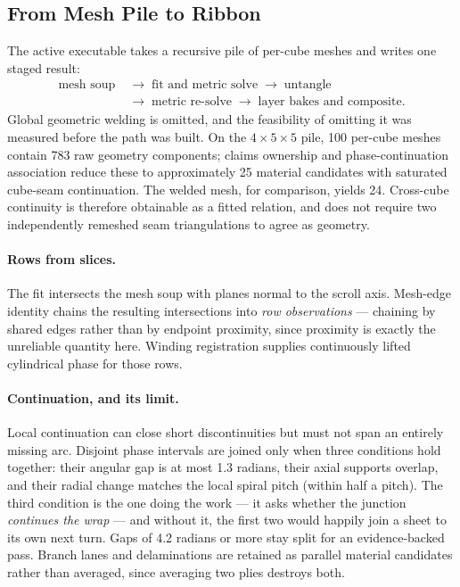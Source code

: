 \subsection{From Mesh Pile to Ribbon}
\label{sec:fit}

The active executable takes a recursive pile of per-cube meshes and writes one staged result:
\begin{align*}
  \text{mesh soup}
  &\;\rightarrow\;\text{fit and metric solve}\;\rightarrow\;\text{untangle}
  \\
  &\;\rightarrow\;\text{metric re-solve}\;\rightarrow\;
  \text{layer bakes and composite}.
\end{align*}
Global geometric welding is omitted, and the feasibility of omitting it was measured before the path was built. On the $4\times5\times5$ pile, 100 per-cube meshes contain 783 raw geometry components; claims ownership and phase-continuation association reduce these to approximately 25 material candidates with saturated cube-seam continuation. The welded mesh, for comparison, yields 24. Cross-cube continuity is therefore obtainable as a fitted relation, and does not require two independently remeshed seam triangulations to agree as geometry.

\paragraph{Rows from slices.} The fit intersects the mesh soup with planes normal to the scroll axis. Mesh-edge identity chains the resulting intersections into \emph{row observations} --- chaining by shared edges rather than by endpoint proximity, since proximity is exactly the unreliable quantity here. Winding registration supplies continuously lifted cylindrical phase for those rows.

\paragraph{Continuation, and its limit.} Local continuation can close short discontinuities but must not span an entirely missing arc. Disjoint phase intervals are joined only when three conditions hold together: their angular gap is at most 1.3 radians, their axial supports overlap, and their radial change matches the local spiral pitch (within half a pitch). The third condition is the one doing the work --- it asks whether the junction \emph{continues the wrap} --- and without it, the first two would happily join a sheet to its own next turn. Gaps of 4.2 radians or more stay split for an evidence-backed pass. Branch lanes and delaminations are retained as parallel material candidates rather than averaged, since averaging two plies destroys both.


